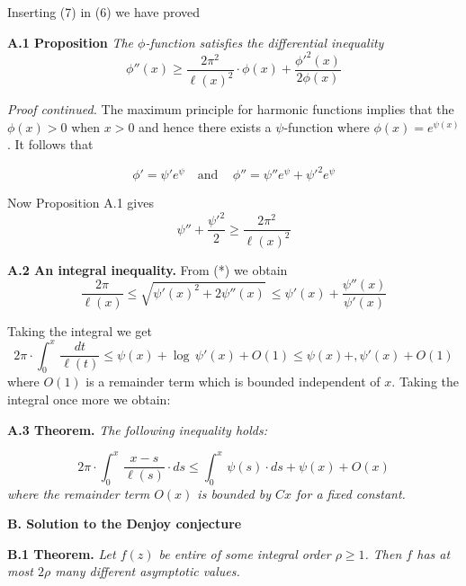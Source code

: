 \documentclass{amsart}
\begin{document}
\noindent
Inserting (7) in (6) we have  proved
\medskip

\noindent
{\bf A.1 Proposition} \emph{The $\phi$-function satisfies the differential inequality}
\[
\phi''(x)\geq \frac{2\pi^2}{\ell(x)^2}\cdot\phi(x)+\frac{\phi'^2(x)}{2\phi(x)}
\]


\noindent
\emph{Proof continued.}
The maximum
principle for harmonic functions implies that the $\phi(x)>0$
when $x>0$ and hence there exists
a $\psi$-function where
$\phi(x)= e^{\psi(x)}$. It follows that

\[ 
\phi'=\psi' e^\psi\quad\text{and}\quad\,\phi''=
\psi''e^\psi+\psi'^2e^\psi
\]

\noindent
Now  Proposition A.1 gives
\[
 \psi''+\frac{\psi'^2}{2}\geq \frac{2\pi^2}{\ell(x)^2}\tag{*}
\]
\medskip


\noindent
{\bf {A.2 An integral inequality.}}
From (*) we obtain
\[
\frac{2\pi}{\ell(x)}\leq\sqrt{\psi'(x)^2+2\psi''(x)}\,\leq
\psi'(x)+\frac{\psi''(x)}{\psi'(x)}
\]
\medskip

\noindent
Taking the integral we get
\[ 
2\pi\cdot\int_0^x\,\frac{dt}{\ell(t)}\leq \psi(x)+\log\,\psi'(x)+O(1)
\leq \psi(x)+,\psi'(x)+O(1)\tag{**}
\]
where $O(1)$ is a remainder 
term which is bounded  independent of $x$. Taking the integral once more we 
obtain:
\medskip

\noindent
{\bf {A.3 Theorem.}}
\emph{The following inequality holds:}


\[
2\pi\cdot\int_0^x\, \frac{x-s}{\ell(s)}\cdot ds\leq
\int_0^x\,\psi(s)\cdot ds+\psi(x)+O(x)
\]
\emph{where the remainder term $O(x)$ is bounded by $Cx$ for 
a fixed constant.}

\bigskip


\centerline {\bf B. Solution to the Denjoy conjecture}
\bigskip

\noindent
{\bf B.1 Theorem.}
\emph{Let $f(z)$ be entire of some integral order
$\rho\geq 1$. Then $f$ has at most $2\rho$ many different asymptotic values.}
\bigskip
\end{document}
